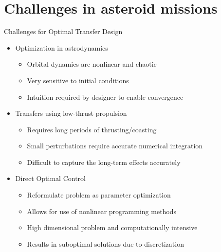 
\section[Challenges]{Challenges in asteroid missions}

\begin{frame}{Challenges for Optimal Transfer Design} %

\begin{itemize}
    \item Optimization in astrodynamics
        \begin{itemize}
            \item Orbital dynamics are nonlinear and chaotic
            \item Very sensitive to initial conditions
            \item Intuition required by designer to enable convergence
        \end{itemize}
    \pause
    \item Transfers using low-thrust propulsion
        \begin{itemize}
            \item Requires long periods of thrusting/coasting
            \item Small perturbations require accurate numerical integration
            \item Difficult to capture the long-term effects accurately
        \end{itemize}
    \pause
    \item Direct Optimal Control
        \begin{itemize}
            \item Reformulate problem as parameter optimization
            \item Allows for use of nonlinear programming methods
            \item High dimensional problem and computationally intensive
            \item Results in suboptimal solutions due to discretization
        \end{itemize}
\end{itemize}

\end{frame}   %


